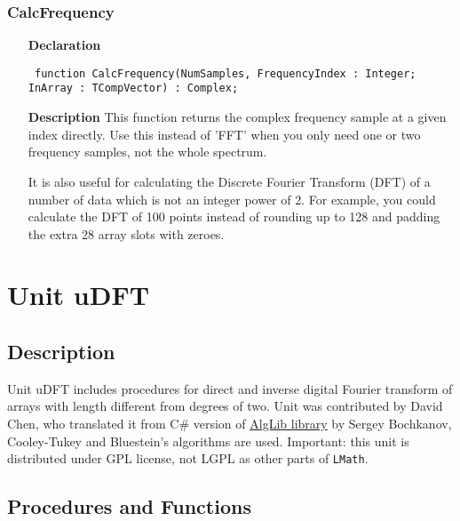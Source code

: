 \documentclass[12pt,a4paper,oneside]{report}
\newcommand{\lmathsix}[1]{   %
	\marginpar{\vspace{#1} 
		\begin{flushright}
			LMath 0.6
	\end{flushright} }
}
\newcommand{\declarationitem}[1]{\textbf{#1}}
\newcommand{\descriptiontitle}[1]{\textbf{#1}}
\newcommand{\code}[1]{\texttt{#1}}
\begin{document}
\subsubsection{CalcFrequency}
\label{ufft-CalcFrequency}
\begin{itemize}\item[\declarationitem{Declaration}\hfill]
	\begin{flushleft}
		\code{
			function CalcFrequency(NumSamples, FrequencyIndex : Integer; InArray : TCompVector) : Complex;}
		
	\end{flushleft}
	\item[\descriptiontitle{Description}]
	This function returns the complex frequency sample at a given index directly. Use this instead of 'FFT' when you only need one or two frequency samples, not the whole spectrum.
	
	It is also useful for calculating the Discrete Fourier Transform (DFT) of a number of data which is not an integer power of 2. For example, you could calculate the DFT of 100 points instead of rounding up to 128 and padding the extra 28 array slots with zeroes.
\end{itemize}

\section{Unit uDFT}\label{sec:uDFT}\lmathsix{-24pt}
\subsection{Description}
Unit uDFT includes procedures for direct and inverse digital Fourier transform of arrays with length different from degrees of two. Unit was contributed by David Chen, who translated it from C\# version of \href{https://www.alglib.net/}{AlgLib library} by Sergey Bochkanov,
 Cooley-Tukey and Bluestein's algorithms are used. Important: this unit is distributed under GPL license, not LGPL as other parts of \code{LMath}. 
\subsection{Procedures and Functions} 
\end{document}
